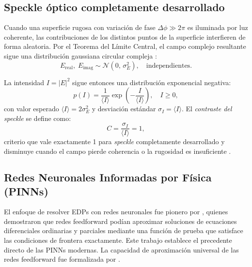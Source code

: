 \subsection{Speckle óptico completamente desarrollado}

Cuando una superficie rugosa con variación de fase $\Delta\phi \gg 2\pi$ es
iluminada por luz coherente, las contribuciones de los distintos puntos de la
superficie interfieren de forma aleatoria. Por el Teorema del Límite Central,
el campo complejo resultante sigue una distribución gaussiana circular compleja
\parencite{goodman2007speckle}:
%
\begin{equation}
    E_\text{real},\; E_\text{imag} \sim \mathcal{N}(0,\, \sigma_E^2),
    \quad \text{independientes.}
    \label{eq:campo_gaussiano}
\end{equation}

La intensidad $I = |E|^2$ sigue entonces una distribución exponencial negativa:
%
\begin{equation}
    p(I) = \frac{1}{\langle I \rangle}
    \exp\!\left(-\frac{I}{\langle I \rangle}\right), \quad I \geq 0,
    \label{eq:pdf_intensidad}
\end{equation}
%
con valor esperado $\langle I \rangle = 2\sigma_E^2$ y desviación estándar
$\sigma_I = \langle I \rangle$. El \textit{contraste del speckle} se define como:
%
\begin{equation}
    C = \frac{\sigma_I}{\langle I \rangle} = 1,
    \label{eq:contraste}
\end{equation}
%
criterio que vale exactamente 1 para \textit{speckle} completamente desarrollado
y disminuye cuando el campo pierde coherencia o la rugosidad es insuficiente
\parencite{goodman2007speckle}.

\subsection{Redes Neuronales Informadas por Física (PINNs)}

El enfoque de resolver EDPs con redes neuronales fue pionero por
\textcite{lagaris1998ann}, quienes demostraron que redes feedforward podían
aproximar soluciones de ecuaciones diferenciales ordinarias y parciales
mediante una función de prueba que satisface las condiciones de frontera
exactamente. Este trabajo establece el precedente directo de las PINNs modernas.
La capacidad de aproximación universal de las redes feedforward fue formalizada
por \textcite{hornik1989universal}.

